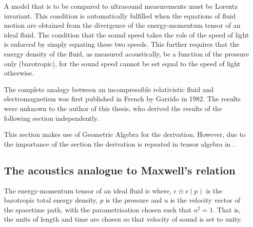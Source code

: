 %
A model that is to be compared to ultrasound measurements must be  Lorentz invariant.
This condition is  automatically fulfilled  when the equations of fluid motion are obtained from the  divergence of the energy-momentum tensor of an ideal fluid.
The condition that the sound speed takes the role  of the speed of light
is enforced by simply equating these two speeds.
This further requires that the energy density of the fluid, as measured acoustically, be a function of the pressure only (barotropic),
for the sound speed cannot be set equal to the speed of light otherwise\cite{Taub1978}.

The complete analogy between an incompressible relativistic fluid and electromagnetism was first published in French by Garrido\cite{Garrido1982} in 1982.
The results were unknown to the author of this thesis, who derived the results of the following section independently.

This section makes use of Geometric Algebra\cite{Hestenes1984,Doran2003} for the derivation.
However, due to the importance of the section the derivation is repeated in tensor algebra in .

\subsection{The acoustics analogue to Maxwell's relation}\label{sec:MaxwellAnalogue}

The energy-momentum tensor of an ideal fluid is\cite{LandauBook, Taub1978}
where, $\epsilon \equiv \epsilon(p)$ is the barotropic total energy density,
$p$ is the pressure
and 
$u$ is the velocity vector of the spacetime path, with the parametrisation chosen such that $u^2 =  1$. %
That is, the units of length and time are chosen so that velocity of sound is set to unity.

